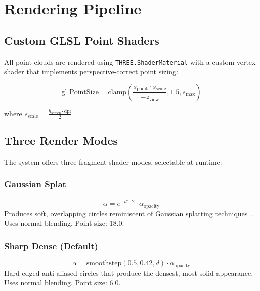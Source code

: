 \documentclass[11pt, letterpaper]{article}
\begin{document}
\section{Rendering Pipeline}

\subsection{Custom GLSL Point Shaders}

All point clouds are rendered using \texttt{THREE.ShaderMaterial} with a custom vertex shader that implements perspective-correct point sizing:

\begin{equation}
    \text{gl\_PointSize} = \text{clamp}\left(\frac{s_{\text{point}} \cdot s_{\text{scale}}}{-z_{\text{view}}}, 1.5, s_{\text{max}}\right)
\end{equation}

where $s_{\text{scale}} = \frac{h_{\text{screen}} \cdot \text{dpr}}{2}$.

\subsection{Three Render Modes}

The system offers three fragment shader modes, selectable at runtime:

\subsubsection{Gaussian Splat}
\begin{equation}
    \alpha = e^{-d^2 \cdot 2} \cdot \alpha_{\text{opacity}}
\end{equation}
Produces soft, overlapping circles reminiscent of Gaussian splatting techniques~\cite{3dgs}. Uses normal blending. Point size: 18.0.

\subsubsection{Sharp Dense (Default)}
\begin{equation}
    \alpha = \text{smoothstep}(0.5, 0.42, d) \cdot \alpha_{\text{opacity}}
\end{equation}
Hard-edged anti-aliased circles that produce the densest, most solid appearance. Uses normal blending. Point size: 6.0.
\end{document}
